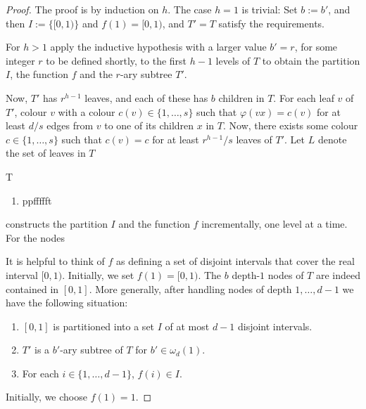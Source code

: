 \documentclass[kpfonts]{patmorin}
\begin{document}
\begin{proof}
  The proof is by induction on $h$.  The case $h=1$ is trivial: Set $b:=b'$, and then $I:=\{[0,1)\}$ and $f(1)=[0,1)$, and $T'=T$ satisfy the requirements.
  
  For $h>1$ apply the inductive hypothesis with a larger value $b'=r$, for some integer $r$ to be defined shortly, to the first $h-1$ levels of $T$ to obtain the partition $I$, the function $f$ and the $r$-ary subtree $T'$.
  
  Now, $T'$ has $r^{h-1}$ leaves, and each of these has $b$ children in $T$.  For each leaf $v$ of $T'$, colour $v$ with a colour $c(v)\in\{1,\ldots,s\}$ such that $\varphi(vx)=c(v)$ for at least $d/s$ edges from $v$ to one of its children $x$ in $T$.  Now, there exists some colour $c\in\{1,\ldots,s\}$ such that $c(v)=c$ for at least $r^{h-1}/s$ leaves of $T'$.  Let $L$ denote the set of leaves in $T$
  
  T
  
  \begin{enumerate}
    \item ppffffft
  \end{enumerate}
  
  
  
  constructs the partition $I$ and the function $f$ incrementally, one level at a time. For the nodes 
  
  
  
  
  
  It is helpful to think of $f$ as defining a set of disjoint intervals that cover the real interval $[0,1)$. 
  Initially, we set $f(1)=[0,1)$. The $b$ depth-$1$ nodes of $T$ are indeed contained in $[0,1]$.  More generally, after handling nodes of depth $1,\ldots,d-1$ we have the following situation:
  \begin{enumerate}
    \item $[0,1]$ is partitioned into a set $I$ of at most $d-1$ disjoint intervals.
    \item $T'$ is a $b'$-ary subtree of $T$ for $b'\in\omega_d(1)$.
    \item For each $i\in\{1,\ldots,d-1\}$, $f(i)\in I$.
  \end{enumerate}
  
    Initially, we choose $f(1)=1$. 
  
\end{proof}
\end{document}
